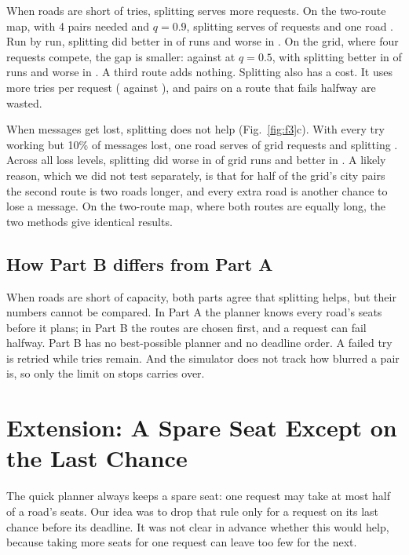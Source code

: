 \documentclass[conference]{IEEEtran}
\begin{document}
When roads are short of tries, splitting serves more requests. On the two-route map, with 4 pairs needed and $q=0.9$, splitting serves \pbTwoBranchMPnFourqNine{} of requests and one road \pbTwoBranchSPnFourqNine. Run by run, splitting did better in \pbBetterTwo{} of \pbRunsTwo{} runs and worse in \pbWorseTwo. On the grid, where four requests compete, the gap is smaller: \pbThreeGridMPnVarqFive{} against \pbThreeGridSPnVarqFive{} at $q=0.5$, with splitting better in \pbBetterThree{} of \pbRunsThree{} runs and worse in \pbWorseThree. A third route adds nothing. Splitting also has a cost. It uses more tries per request (\pbattThreeGridMPnVarqFive{} against \pbattThreeGridSPnVarqFive), and pairs on a route that fails halfway are wasted.

When messages get lost, splitting does not help (Fig.~\ref{fig:f3}c). With every try working but 10\% of messages lost, one road serves \pbFourGridSPnVardOne{} of grid requests and splitting \pbFourGridMPnVardOne. Across all loss levels, splitting did worse in \pbWorseFourGrid{} of \pbRunsFourGrid{} grid runs and better in \pbBetterFourGrid. A likely reason, which we did not test separately, is that for half of the grid's city pairs the second route is two roads longer, and every extra road is another chance to lose a message. On the two-route map, where both routes are equally long, the two methods give identical results.

\subsection{How Part B differs from Part A}
When roads are short of capacity, both parts agree that splitting helps, but their numbers cannot be compared. In Part A the planner knows every road's seats before it plans; in Part B the routes are chosen first, and a request can fail halfway. Part B has no best-possible planner and no deadline order. A failed try is retried while tries remain. And the simulator does not track how blurred a pair is, so only the limit on stops carries over.

\section{Extension: A Spare Seat Except on the Last Chance}
The quick planner always keeps a spare seat: one request may take at most half of a road's seats. Our idea was to drop that rule only for a request on its last chance before its deadline. It was not clear in advance whether this would help, because taking more seats for one request can leave too few for the next.
\end{document}
